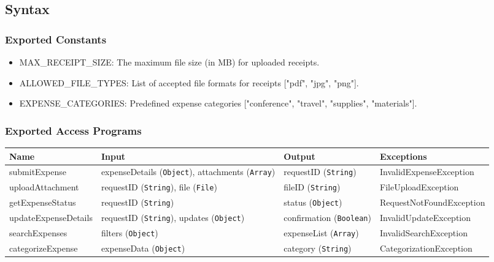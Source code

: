 \documentclass[12pt, titlepage]{article}
\begin{document}
\subsection{Syntax}
\subsubsection{Exported Constants}
\begin{itemize}
    \item MAX\_RECEIPT\_SIZE: The maximum file size (in MB) for uploaded receipts.
    \item ALLOWED\_FILE\_TYPES: List of accepted file formats for receipts ["pdf", "jpg", "png"].
    \item EXPENSE\_CATEGORIES: Predefined expense categories ["conference", "travel", "supplies", "materials"].
\end{itemize}

\subsubsection{Exported Access Programs}
\begin{center}
    \begin{tabular}{|p{3cm}|p{4cm}|p{4cm}|p{4cm}|}
        \hline
        \textbf{Name} & \textbf{Input} & \textbf{Output} & \textbf{Exceptions} \\
        \hline
        submitExpense & expenseDetails (\texttt{Object}), attachments (\texttt{Array}) & requestID (\texttt{String}) & InvalidExpenseException \\
        \hline
        uploadAttachment & requestID (\texttt{String}), file (\texttt{File}) & fileID (\texttt{String}) & FileUploadException \\
        \hline
        getExpenseStatus & requestID (\texttt{String}) & status (\texttt{Object}) & RequestNotFoundException \\
        \hline
        updateExpenseDetails & requestID (\texttt{String}), updates (\texttt{Object}) & confirmation (\texttt{Boolean}) & InvalidUpdateException \\
        \hline
        searchExpenses & filters (\texttt{Object}) & expenseList (\texttt{Array}) & InvalidSearchException \\
        \hline
        categorizeExpense & expenseData (\texttt{Object}) & category (\texttt{String}) & CategorizationException \\
        \hline
    \end{tabular}
\end{center}
\end{document}
